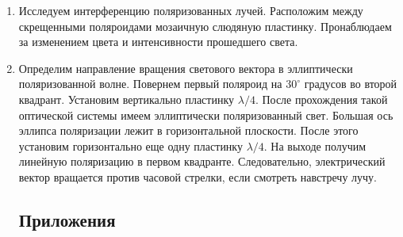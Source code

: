 \documentclass[14pt, a4paper]{report}
\begin{document}
\begin{enumerate}
\item Исследуем интерференцию поляризованных лучей. Расположим между скрещенными поляроидами мозаичную слюдяную пластинку. Пронаблюдаем за изменением цвета и интенсивности прошедшего света.

\item Определим направление вращения светового вектора в эллиптически поляризованной волне. Повернем первый поляроид на $30^\circ$ градусов во второй квадрант. Установим вертикально пластинку $\lambda/4$. После прохождения такой оптической системы имеем эллиптически поляризованный свет. Большая ось эллипса поляризации лежит в горизонтальной плоскости. После этого установим горизонтально еще одну пластинку $\lambda/4$. На выходе получим линейную поляризацию в первом квадранте. Следовательно, электрический вектор вращается против часовой стрелки, если смотреть навстречу лучу.

\subsection{Приложения}


\end{enumerate}
\end{document}
